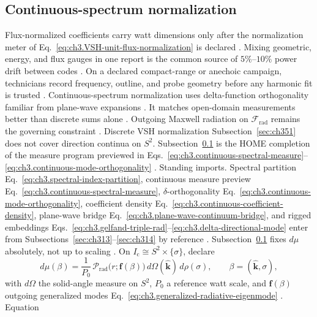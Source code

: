 \subsection{Continuous-spectrum normalization}
\label{sec:ch352}
Flux-normalized coefficients carry watt dimensions only after the normalization meter of Eq.~\eqref{eq:ch3.VSH-unit-flux-normalization} is declared \cite{poynting1884,stratton1941}. Mixing geometric, energy, and flux gauges in one report is the common source of $5\%$--$10\%$ power drift between codes \cite{harrington2001}.
On a declared compact-range or anechoic campaign, technicians record frequency, outline, and probe geometry before any harmonic fit is trusted \cite{hansen1988}. Continuous-spectrum normalization uses delta-function orthogonality familiar from plane-wave expansions \cite{stratton1941}. It matches open-domain measurements better than discrete sums alone \cite{harrington2001}. Outgoing Maxwell radiation on $\mathcal{F}_{\mathrm{rad}}$ remains the governing constraint \cite{stratton1941}.
Discrete VSH normalization Subsection~\ref{sec:ch351} does not cover direction continua on \(S^{2}\). Subsection~\ref{sec:ch352}
is the HOME completion of the measure program previewed in Eqs.~\eqref{eq:ch3.continuous-spectral-measure}--\eqref{eq:ch3.continuous-mode-orthogonality}
\cite{stratton1941}.
Standing imports. Spectral partition Eq.~\eqref{eq:ch3.spectral-index-partition}, continuous measure preview
Eq.~\eqref{eq:ch3.continuous-spectral-measure}, \(\delta\)-orthogonality
Eq.~\eqref{eq:ch3.continuous-mode-orthogonality}, coefficient density
Eq.~\eqref{eq:ch3.continuous-coefficient-density}, plane-wave bridge
Eq.~\eqref{eq:ch3.plane-wave-continuum-bridge}, and rigged embeddings
Eqs.~\eqref{eq:ch3.gelfand-triple-rad}--\eqref{eq:ch3.delta-directional-mode} enter from Subsections~\ref{sec:ch313}--\ref{sec:ch314}
by reference \cite{stratton1941}. Subsection~\ref{sec:ch352} fixes \(d\mu\) absolutely, not up to scaling
\cite{harrington2001}.
On \(I_{\mathrm{c}}\cong S^{2}\times\{\sigma\}\), declare
\begin{equation}
\label{eq:ch3.continuous-measure-flux-fix}
d\mu(\beta)
=
\frac{1}{P_{0}}\,
\mathcal{P}_{\mathrm{rad}}\!\bigl(r;\mathbf{f}(\beta)\bigr)\,d\Omega(\hat{\mathbf{k}})\,d\rho(\sigma),
\qquad
\beta=(\hat{\mathbf{k}},\sigma),
\end{equation}
with \(d\Omega\) the solid-angle measure on \(S^{2}\), \(P_{0}\) a reference watt scale, and \(\mathbf{f}(\beta)\) outgoing
generalized modes Eq.~\eqref{eq:ch3.generalized-radiative-eigenmode} \cite{jackson1999}. Equation
